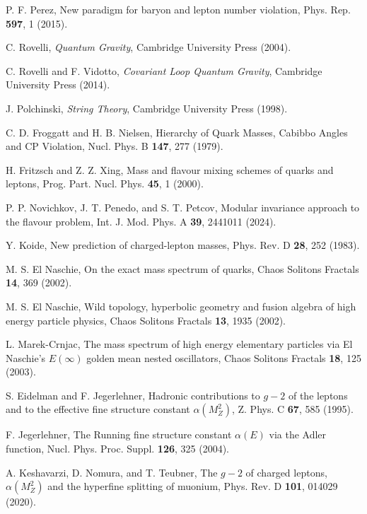 \documentclass[%
amsmath,amssymb,
aps,
prb,
floatfix, showkeys, 10pt,
]{revtex4-2}
\begin{document}
\begin{thebibliography}{99}
P. F. Perez, 
New paradigm for baryon and lepton number violation, 
Phys. Rep. \textbf{597}, 1 (2015).

C. Rovelli, 
\textit{Quantum Gravity}, 
Cambridge University Press (2004).

C. Rovelli and F. Vidotto, 
\textit{Covariant Loop Quantum Gravity}, 
Cambridge University Press (2014).

J. Polchinski, 
\textit{String Theory}, 
Cambridge University Press (1998).

C. D. Froggatt and H. B. Nielsen, 
Hierarchy of Quark Masses, Cabibbo Angles and CP Violation, 
Nucl. Phys. B \textbf{147}, 277 (1979).

H. Fritzsch and Z. Z. Xing, 
Mass and flavour mixing schemes of quarks and leptons, 
Prog. Part. Nucl. Phys. \textbf{45}, 1 (2000).

P. P. Novichkov, J. T. Penedo, and S. T. Petcov, 
Modular invariance approach to the flavour problem, 
Int. J. Mod. Phys. A \textbf{39}, 2441011 (2024).

Y. Koide, 
New prediction of charged-lepton masses, 
Phys. Rev. D \textbf{28}, 252 (1983).

M. S. El Naschie, 
On the exact mass spectrum of quarks, 
Chaos Solitons Fractals \textbf{14}, 369 (2002).

M. S. El Naschie, 
Wild topology, hyperbolic geometry and fusion algebra of high energy particle physics, 
Chaos Solitons Fractals \textbf{13}, 1935 (2002).

L. Marek-Crnjac, 
The mass spectrum of high energy elementary particles via El Naschie's $E(\infty)$ golden mean nested oscillators, 
Chaos Solitons Fractals \textbf{18}, 125 (2003).

S. Eidelman and F. Jegerlehner, 
Hadronic contributions to $g-2$ of the leptons and to the effective fine structure constant $\alpha(M_Z^2)$, 
Z. Phys. C \textbf{67}, 585 (1995).

F. Jegerlehner, 
The Running fine structure constant $\alpha(E)$ via the Adler function, 
Nucl. Phys. Proc. Suppl. \textbf{126}, 325 (2004).

A. Keshavarzi, D. Nomura, and T. Teubner, 
The $g-2$ of charged leptons, $\alpha(M_Z^2)$ and the hyperfine splitting of muonium, 
Phys. Rev. D \textbf{101}, 014029 (2020).


\end{thebibliography}
\end{document}
